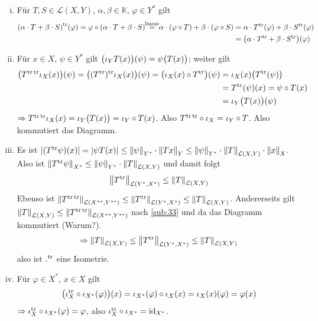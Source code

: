 \begin{enumerate}[(i)]
	\item Für $T,S \in \mathcal{L}(X,Y)$, $\alpha, \beta \in \mathds{K}$, $\varphi \in Y^*$ gilt
	\begin{align*}
		\enbrace*{\alpha \cdot T + \beta \cdot S}^\tr (\varphi) = \varphi \circ \enbrace*{\alpha \cdot T + \beta \cdot S} \!\!\stackrel{\text{linear}}{=} \!\!
		\alpha \cdot (\varphi \circ T) + \beta \cdot (\varphi \circ S)  &= \alpha \cdot T^\tr(\varphi) + \beta \cdot S^\tr(\varphi)\\
		&= \enbrace*{\alpha \cdot T^\tr + \beta \cdot S^\tr}(\varphi) 
	\end{align*}
	\item Für $x \in X$, $\psi \in Y^*$ gilt $\enbrace[\big]{\iota_Y T(x)}(\psi) = \psi \enbrace[\big]{T(x)}$; weiter gilt
	\begin{align*}
		\enbrace[\big]{T^{\tr \, \tr} \iota_X(x)} (\psi) = \enbrace[\big]{(T^\tr)^\tr \iota_X(x)}(\psi)  = \enbrace[\big]{\iota_X(x) \circ T^\tr}(\psi)
		&= \iota_X(x) \enbrace*{T^\tr(\psi)}  \\
		&= T^\tr(\psi)(x) = \psi \circ T(x) \\
		&= \iota_Y \enbrace[\big]{T(x)} (\psi) 
	\end{align*}
	$\Rightarrow T^{\tr \, \tr} \iota_X(x) = \iota_Y \enbrace[\big]{T(x)} = \iota_Y \circ T (x)$. Also $T^{\tr \, \tr} \circ \iota_X = \iota_Y  \circ T$. Also kommutiert
	das Diagramm.
	\item Es ist $\abs{(T^\tr \psi)(x)} = \abs*{\psi T(x)} \le \norm[Y^*]{\psi} \cdot \norm[Y]{T x} \le \norm[Y^*]{\psi} \cdot \norm[\mathcal{L}(X,Y)]{T} \cdot \norm[X]{x}$. Also
	ist $\norm[X^*]{T^\tr \psi} \le  \norm[Y^*]{\psi} \cdot  \norm[\mathcal{L}(X,Y)]{T}$ und damit folgt 
	\[
		\norm[\mathcal{L}(Y^*,X^*)]{T^\tr} \le \norm[\mathcal{L}(X,Y)]{T}  
	\]
	Ebenso ist $\norm[\mathcal{L}(X^{**},Y^{**})]{T^{\tr \, \tr}} \le \norm[\mathcal{L}(Y^*,X^*)]{T^\tr} \le \norm[\mathcal{L}(X,Y)]{T}$. Andererseits gilt 
	$\norm[\mathcal{L}(X,Y)]{T} \le \norm[\mathcal{L}(X^{**},Y^{**})]{T^{\tr\, \tr}}$ nach \ref{sub:33} und da das Diagramm kommutiert (Warum?). 
	\[
		\Rightarrow \norm[\mathcal{L}(X,Y)]{T} \le \norm[\mathcal{L}(Y^*,X^*)]{T^\tr}  \le  \norm[\mathcal{L}(X,Y)]{T} 
	\]
	also ist $.^\tr$ eine Isometrie.
	\item Für $\varphi \in X^*$, $x \in X$ gilt
	\begin{align*}
		\enbrace[\big]{\iota_X^\tr \circ \iota_{X^*} (\varphi)} (x) = \iota_{X^*}(\varphi) \circ \iota_X (x) = \iota_X(x)(\varphi) = \varphi(x)
	\end{align*}
	$\Rightarrow \iota_X^\tr \circ \iota_{X^*}(\varphi)= \varphi$, also $\iota_X^\tr \circ  \iota_{X^*} = \id_{X^*}$. \bewende
\end{enumerate}

